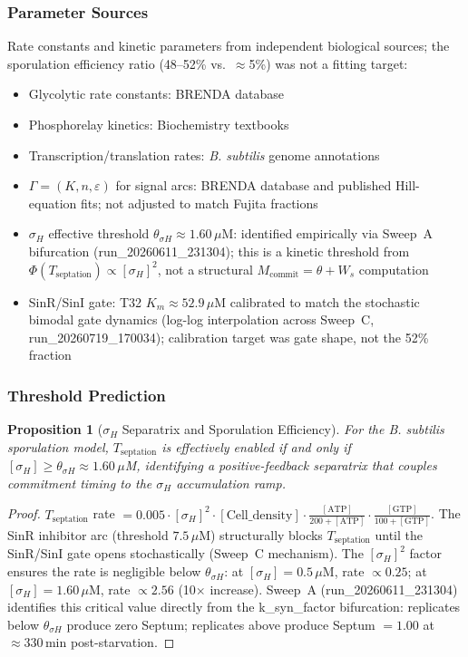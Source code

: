 \documentclass[10pt,letterpaper]{article}
\newtheorem{proposition}{Proposition}
\begin{document}
\subsubsection{Parameter Sources}

Rate constants and kinetic parameters from independent biological sources; the sporulation efficiency ratio (48--52\% vs.\ $\approx$5\%) was not a fitting target:
\begin{itemize}
\item Glycolytic rate constants: BRENDA database~\cite{schomburg2004}
\item Phosphorelay kinetics: Biochemistry textbooks~\cite{voet2016}
\item Transcription/translation rates: \textit{B. subtilis} genome annotations~\cite{barbe2009}
\item $\Gamma = (K, n, \varepsilon)$ for signal arcs: BRENDA database and published Hill-equation fits; not adjusted to match Fujita fractions
\item $\sigma_H$ effective threshold $\theta_{\sigma H} \approx 1.60\,\mu$M: identified empirically via Sweep~A bifurcation (run\_20260611\_231304); this is a kinetic threshold from $\Phi(T_{\text{septation}}) \propto [\sigma_H]^2$, not a structural $M_{\text{commit}} = \theta + W_s$ computation
\item SinR/SinI gate: T32 $K_m \approx 52.9\,\mu$M calibrated to match the stochastic bimodal gate dynamics (log-log interpolation across Sweep~C, run\_20260719\_170034); calibration target was gate shape, not the 52\% fraction
\end{itemize}

\subsubsection{Threshold Prediction}

\begin{proposition}[$\sigma_H$ Separatrix and Sporulation Efficiency]
\label{prop:sigmaH_separatrix}
For the \textit{B. subtilis} sporulation model, $T_{\mathrm{septation}}$ is effectively enabled if and only if $[\sigma_H] \geq \theta_{\sigma H} \approx 1.60\,\mu$M, identifying a positive-feedback separatrix that couples commitment timing to the $\sigma_H$ accumulation ramp.
\end{proposition}

\begin{proof}
$T_{\mathrm{septation}}$ rate $= 0.005 \cdot [\sigma_H]^2 \cdot [\text{Cell\_density}] \cdot \frac{[\text{ATP}]}{200 + [\text{ATP}]} \cdot \frac{[\text{GTP}]}{100 + [\text{GTP}]}$.
The SinR inhibitor arc (threshold $7.5\,\mu$M) structurally blocks $T_{\mathrm{septation}}$ until the SinR/SinI gate opens stochastically (Sweep~C mechanism). The $[\sigma_H]^2$ factor ensures the rate is negligible below $\theta_{\sigma H}$: at $[\sigma_H] = 0.5\,\mu$M, rate $\propto 0.25$; at $[\sigma_H] = 1.60\,\mu$M, rate $\propto 2.56$ (10$\times$ increase). Sweep~A (run\_20260611\_231304) identifies this critical value directly from the k\_syn\_factor bifurcation: replicates below $\theta_{\sigma H}$ produce zero Septum; replicates above produce Septum $= 1.00$ at $\approx 330\,\text{min}$ post-starvation.
\end{proof}
\end{document}
